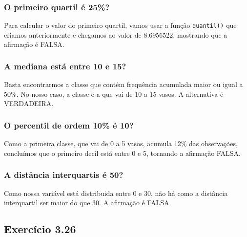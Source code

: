 \documentclass[
]{latex/krantz}
\theoremstyle{definition}
\theoremstyle{definition}
\theoremstyle{definition}
\theoremstyle{definition}
\theoremstyle{remark}
\begin{document}
\hypertarget{o-primeiro-quartil-uxe9-25}{%
\subsubsection*{O primeiro quartil é 25\%?}\label{o-primeiro-quartil-uxe9-25}}

Para calcular o valor do primeiro quartil, vamos usar a função \texttt{quantil()} que criamos anteriormente e chegamos ao valor de 8.6956522, mostrando que a afirmação é FALSA.

\hypertarget{a-mediana-estuxe1-entre-10-e-15}{%
\subsubsection*{A mediana está entre 10 e 15?}\label{a-mediana-estuxe1-entre-10-e-15}}

Basta encontrarmos a classe que contém frequência acumulada maior ou igual a 50\%. No nosso caso, a classe é a que vai de 10 a 15 vasos. A alternativa é VERDADEIRA.

\hypertarget{o-percentil-de-ordem-10-uxe9-10}{%
\subsubsection*{O percentil de ordem 10\% é 10?}\label{o-percentil-de-ordem-10-uxe9-10}}

Como a primeira classe, que vai de 0 a 5 vasos, acumula 12\% das observações, concluímos que o primeiro decil está entre 0 e 5, tornando a afirmação FALSA.

\hypertarget{a-distuxe2ncia-interquartis-uxe9-50}{%
\subsubsection*{A distância interquartis é 50?}\label{a-distuxe2ncia-interquartis-uxe9-50}}

Como nossa variável está distribuida entre 0 e 30, não há como a distância interquartil ser maior do que 30. A afirmação é FALSA.

\hypertarget{exr3-26}{%
\subsection*{Exercício 3.26}\label{exr3-26}}
\end{document}

